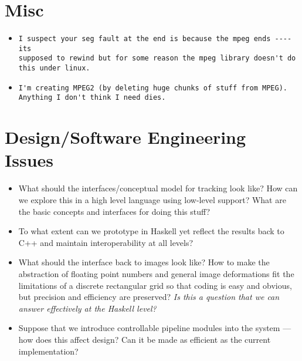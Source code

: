 \section{Misc}

\begin{itemize}
\item
\begin{verbatim}
I suspect your seg fault at the end is because the mpeg ends ---- its
supposed to rewind but for some reason the mpeg library doesn't do
this under linux.
\end{verbatim}

\item
\begin{verbatim}
I'm creating MPEG2 (by deleting huge chunks of stuff from MPEG).
Anything I don't think I need dies. 
\end{verbatim}
\end{itemize}


\section{Design/Software Engineering Issues}

\begin{itemize}

\item What should the interfaces/conceptual model for tracking look
like?  How can we explore this in a high level language using
low-level support?  What are the basic concepts and interfaces for
doing this stuff?

\item To what extent can we prototype in Haskell yet reflect the
results back to C++ and maintain interoperability at all levels?

\item What should the interface back to images look like?  How to make
the abstraction of floating point numbers and general image deformations
fit the limitations of a discrete rectangular grid so that coding is
easy and obvious, but precision and efficiency are preserved?  {\it Is
this a question that we can answer effectively at the Haskell level?}

\item Suppose that we introduce controllable pipeline modules into the
system --- how does this affect design?  Can it be made as efficient
as the current implementation?

\end{itemize}



